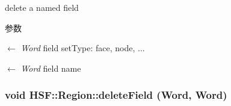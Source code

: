 delete a named field 
\begin{DoxyParams}{参数}
\item[\mbox{$\leftarrow$} {\em Word}]field setType: face, node, ... \item[\mbox{$\leftarrow$} {\em Word}]field name \end{DoxyParams}
\hypertarget{classHSF_1_1Region_ab74797105c6eaf54c3d5101a919d15b6}{
\subsubsection[{deleteField}]{\setlength{\rightskip}{0pt plus 5cm}void HSF::Region::deleteField (Word, \/  Word)}}
\label{classHSF_1_1Region_ab74797105c6eaf54c3d5101a919d15b6}


